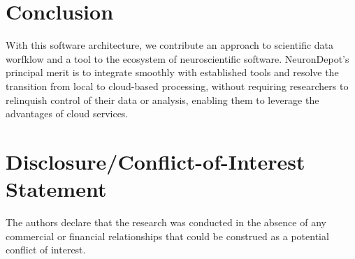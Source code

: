 \documentclass{frontiersSCNS} %
\begin{document}
\section{Conclusion}
With this software architecture, we contribute an approach to scientific data
worfklow and a tool to the ecosystem of neuroscientific software. NeuronDepot's
principal merit is to integrate smoothly with established tools and resolve the
transition from local to cloud-based processing, without requiring researchers
to relinquish control of their data or analysis, enabling them to leverage
the advantages of cloud services.

\section*{Disclosure/Conflict-of-Interest Statement}

The authors declare that the research was conducted in the absence of any commercial or financial relationships that could be construed as a potential conflict of interest.

\end{document}
